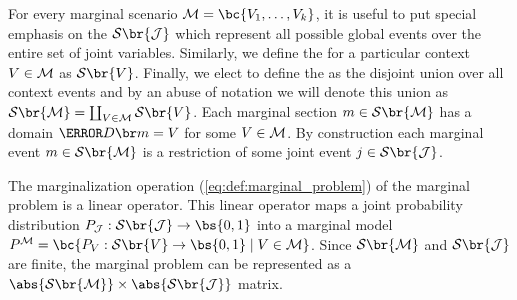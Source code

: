 \documentclass[aps, 10pt, english, twoside, pra, nofootinbib, tightenlines, longbibliography, superscriptaddress]{revtex4-1}
\renewcommand{\Events}[1]{\mathcal{S}\br{#1}} %
\begin{document}
    For every marginal scenario $\mscenario = \bc{V_1, \ldots, V_k}$, it is useful to put special emphasis on the  $\Events{\jointvar}$ which represent all possible global events over the entire set of joint variables. Similarly, we define the  for a particular context $V \in \mathcal{M}$ as $\Events{V}$. Finally, we elect to define the  as the disjoint union over all context events and by an abuse of notation we will denote this union as $\Events{\mscenario} = \coprod_{V \in \mscenario} \Events{V}$. Each marginal section $m \in \Events{\mscenario}$ has a domain $\Dom{m} = V$ for some $V \in \mathcal{M}$. By construction each marginal event $m \in \Events{\mscenario}$ is a restriction of some joint event $j \in \Events{\jointvar}$.

    The marginalization operation (\cref{eq:def:marginal_problem}) of the marginal problem is a linear operator. This linear operator maps a joint probability distribution $\prob[\jointvar] : \Events{\jointvar} \to \bs{0,1}$ into a marginal model $\prob^{\mscenario} = \bc{\prob[V] : \Events{V} \to \bs{0,1} \mid V \in \mscenario}$. Since $\Events{\mscenario}$ and $\Events{\jointvar}$ are finite, the marginal problem can be represented as a $\abs{\Events{\mscenario}} \times \abs{\Events{\jointvar}}$ matrix.
\end{document}
